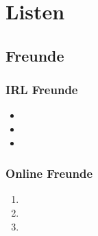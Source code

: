 \section{Listen}
\subsection{Freunde}

\subsubsection{IRL Freunde}

\begin{itemize}
	\item 
	\item 
	\item 
\end{itemize}


\subsubsection{Online Freunde}

\begin{enumerate}[label=\Roman*]
	\item 
	\item 
	\item
\end{enumerate}
